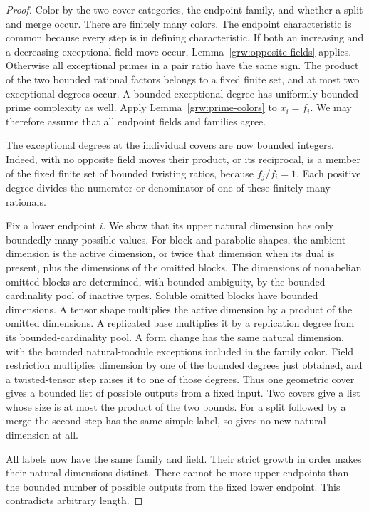 \begin{proof}
Color by the two cover categories, the endpoint family, and whether a
split and merge occur.  There are finitely many colors.  The endpoint
characteristic is common because every step is in defining
characteristic.  If both an increasing and a decreasing exceptional
field move occur, Lemma~\ref{grw:opposite-fields} applies.  Otherwise
all exceptional primes in a pair ratio have the same sign.  The product
of the two bounded rational factors belongs to a fixed finite set, and
at most two exceptional degrees occur.  A bounded exceptional degree
has uniformly bounded prime complexity as well.  Apply
Lemma~\ref{grw:prime-colors} to $x_i=f_i$.  We may therefore assume
that all endpoint fields and families agree.

The exceptional degrees at the individual covers are now bounded
integers.  Indeed, with no opposite field moves their product, or its
reciprocal, is a member of the fixed finite set of bounded twisting
ratios, because $f_j/f_i=1$.  Each positive degree divides the numerator
or denominator of one of these finitely many rationals.

Fix a lower endpoint $i$.  We show that its upper natural dimension has
only boundedly many possible values.  For block and parabolic shapes,
the ambient dimension is the active dimension, or twice that dimension
when its dual is present, plus the dimensions of the omitted blocks.
The dimensions of nonabelian omitted blocks are determined, with bounded
ambiguity, by the bounded-cardinality pool of inactive types.  Soluble
omitted blocks have bounded dimensions.  A tensor shape multiplies the
active dimension by a product of the omitted dimensions.  A replicated
base multiplies it by a replication degree from its bounded-cardinality
pool.  A form change has the same natural dimension, with the bounded
natural-module exceptions included in the family color.  Field
restriction multiplies dimension by one of the bounded degrees just
obtained, and a twisted-tensor step raises it to one of those degrees.
Thus one geometric cover gives a bounded list of possible outputs from
a fixed input.  Two covers give a list whose size is at most the product
of the two bounds.  For a split followed by a merge the second step has
the same simple label, so gives no new natural dimension at all.

All labels now have the same family and field.  Their strict growth in
order makes their natural dimensions distinct.  There cannot be more
upper endpoints than the bounded number of possible outputs from the
fixed lower endpoint.  This contradicts arbitrary length.
\end{proof}

